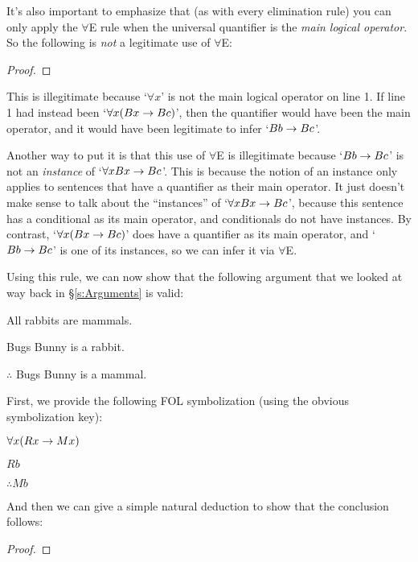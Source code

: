 It's also important to emphasize that (as with every elimination rule) you can only apply the $\forall$E rule when the universal quantifier is the \emph{main logical operator}. So the following is \emph{not} a legitimate use of $\forall $E:
\begin{proof}
\end{proof}
This is illegitimate because `$\forall x$' is not the main logical operator on line 1. If line 1 had instead been `$\forall x(Bx \rightarrow Bc)$', then the quantifier would have been the main operator, and it would have been legitimate to infer `$Bb \rightarrow Bc$'.

Another way to put it is that this use of $\forall$E is illegitimate because `$Bb \rightarrow Bc$' is not an \emph{instance} of `$\forall x Bx \rightarrow Bc$'.  This is because the notion of an instance only applies to sentences that have a quantifier as their main operator.  It just doesn't make sense to talk about the ``instances'' of `$\forall x Bx \rightarrow Bc$', because this sentence has a conditional as its main operator, and conditionals do not have instances.  By contrast, `$\forall x(Bx \rightarrow Bc)$' does have a quantifier as its main operator, and `$Bb \rightarrow Bc$' is one of its instances, so we can infer it via $\forall$E.

Using this rule, we can now show that the following argument that we looked at way back in \S\ref{s:Arguments} is valid:
\begin{earg}
\item[]All rabbits are mammals.
\item[] Bugs Bunny is a rabbit.
\item[] $\therefore$ Bugs Bunny is a mammal.
\end{earg}
First, we provide the following FOL symbolization (using the obvious symbolization key):
\begin{earg}
\item[]$\forall x(Rx \rightarrow Mx)$
\item[] $Rb$
\item[] $\therefore Mb$
\end{earg}
And then we can give a simple natural deduction to show that the conclusion follows:

\begin{proof}
	  
	 
	 
\end{proof}



